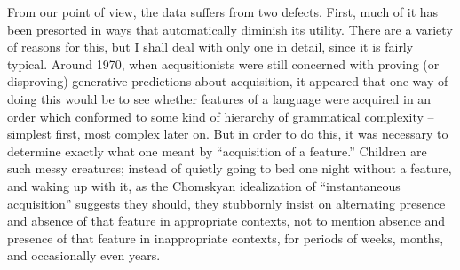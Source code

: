 From our point of view, the data suffers from two defects. First, much of it has been presorted in ways that automatically diminish its utility. There are a variety of reasons for this, but I shall deal with only one in detail, since it is fairly typical. Around 1970, when acqusitionists were still concerned with proving (or disproving) generative predictions about acquisition, it appeared that one way of doing this would be to see whether features of a language were acquired in an order which conformed to some kind of hierarchy of grammatical complexity -- simplest first, most complex later on. But in order to do this, it was necessary to determine exactly what one meant by ``acquisition of a feature.'' Children are such messy creatures; instead of quietly going to bed one night without a feature, and waking up with it, as the Chomskyan idealization of ``instantaneous acquisition'' suggests they should, they stubbornly insist on alternating presence and absence of that feature in appropriate contexts, not to mention absence and presence of that feature in inappropriate contexts, for periods of weeks, months, and occasionally even years.

